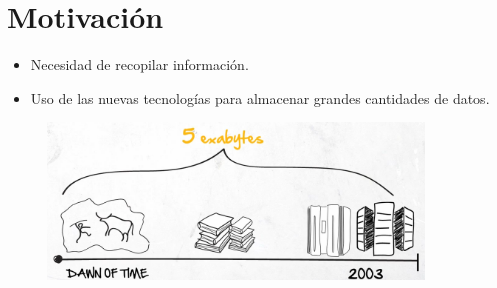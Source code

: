 
\section{Motivación}

{
	
	\begin{frame}{}
		\begin{itemize}
			\item Necesidad de recopilar información.
			\item Uso de las nuevas tecnologías para almacenar grandes cantidades de datos.		
		\end{itemize}	
			
		\begin{figure}[H]
			\centering
			\includegraphics[width=10cm]{./Images/data.png}
		\end{figure}
	\end{frame}
}
			

